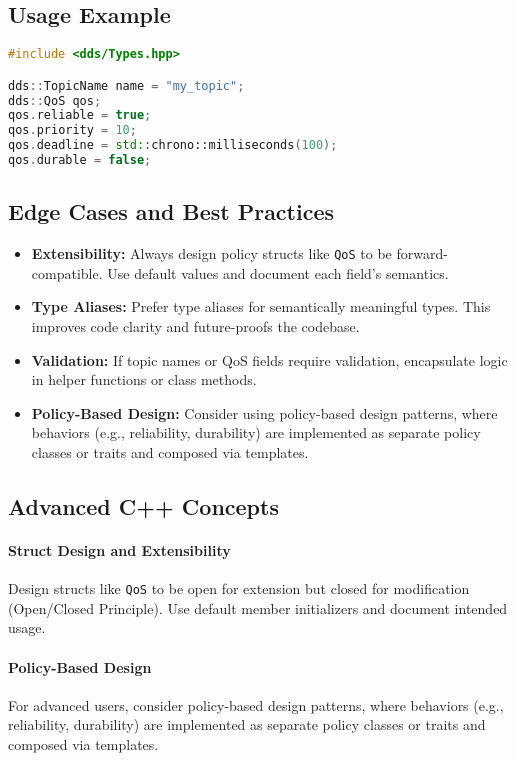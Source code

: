 \documentclass[12pt]{report}
\begin{document}
\subsection{Usage Example}
\begin{lstlisting}[language=C++]
#include <dds/Types.hpp>

dds::TopicName name = "my_topic";
dds::QoS qos;
qos.reliable = true;
qos.priority = 10;
qos.deadline = std::chrono::milliseconds(100);
qos.durable = false;
\end{lstlisting}

\subsection{Edge Cases and Best Practices}
\begin{itemize}
    \item \textbf{Extensibility:} Always design policy structs like \texttt{QoS} to be forward-compatible. Use default values and document each field's semantics.
    \item \textbf{Type Aliases:} Prefer type aliases for semantically meaningful types. This improves code clarity and future-proofs the codebase.
    \item \textbf{Validation:} If topic names or QoS fields require validation, encapsulate logic in helper functions or class methods.
    \item \textbf{Policy-Based Design:} Consider using policy-based design patterns, where behaviors (e.g., reliability, durability) are implemented as separate policy classes or traits and composed via templates.
\end{itemize}

\subsection{Advanced C++ Concepts}
\paragraph{Struct Design and Extensibility}
Design structs like \texttt{QoS} to be open for extension but closed for modification (Open/Closed Principle). Use default member initializers and document intended usage.

\paragraph{Policy-Based Design}
For advanced users, consider policy-based design patterns, where behaviors (e.g., reliability, durability) are implemented as separate policy classes or traits and composed via templates.
\end{document}
